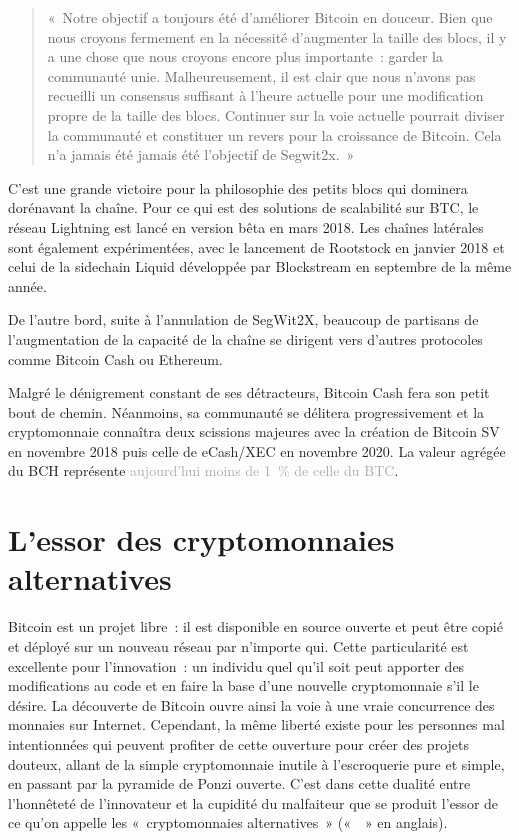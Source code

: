 \begin{quote}
«~Notre objectif a toujours été d'améliorer Bitcoin en douceur. Bien que nous croyons fermement en la nécessité d'augmenter la taille des blocs, il y a une chose que nous croyons encore plus importante~: garder la communauté unie. Malheureusement, il est clair que nous n'avons pas recueilli un consensus suffisant à l'heure actuelle pour une modification propre de la taille des blocs. Continuer sur la voie actuelle pourrait diviser la communauté et constituer un revers pour la croissance de Bitcoin. Cela n'a jamais été jamais été l'objectif de Segwit2x.~»
\end{quote}

C'est une grande victoire pour la philosophie des petits blocs qui dominera dorénavant la chaîne. Pour ce qui est des solutions de scalabilité sur BTC, le réseau Lightning est lancé en version bêta en mars 2018. Les chaînes latérales sont également expérimentées, avec le lancement de Rootstock en janvier 2018 et celui de la sidechain Liquid développée par Blockstream en septembre de la même année.

De l'autre bord, suite à l'annulation de SegWit2X, beaucoup de partisans de l'augmentation de la capacité de la chaîne se dirigent vers d'autres protocoles comme Bitcoin Cash ou Ethereum.

Malgré le dénigrement constant de ses détracteurs, Bitcoin Cash fera son petit bout de chemin. Néanmoins, sa communauté se délitera progressivement et la cryptomonnaie connaîtra deux scissions majeures avec la création de Bitcoin SV en novembre 2018 puis celle de eCash/XEC en novembre 2020. La valeur agrégée du BCH représente \textcolor{darkgray}{aujourd'hui moins de 1~\% de celle du BTC}.

\section*{L'essor des cryptomonnaies alternatives}

Bitcoin est un projet libre~: il est disponible en source ouverte et peut être copié et déployé sur un nouveau réseau par n'importe qui. Cette particularité est excellente pour l'innovation~: un individu quel qu'il soit peut apporter des modifications au code et en faire la base d'une nouvelle cryptomonnaie s'il le désire. La découverte de Bitcoin ouvre ainsi la voie à une vraie concurrence des monnaies sur Internet. Cependant, la même liberté existe pour les personnes mal intentionnées qui peuvent profiter de cette ouverture pour créer des projets douteux, allant de la simple cryptomonnaie inutile à l'escroquerie pure et simple, en passant par la pyramide de Ponzi ouverte. C'est dans cette dualité entre l'honnêteté de l'innovateur et la cupidité du malfaiteur que se produit l'essor de ce qu'on appelle les «~cryptomonnaies alternatives~» («~~» en anglais).

